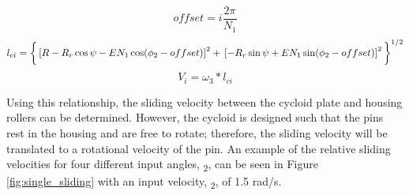 \begin{equation} \label{eq:single_slide_offset}
offset = i \frac{2\pi}{N_1}
\end{equation}
\begin{dmath} \label{eq:single_slide_length}
l_{ci} = \bigg\{\left[R-R_r\cos\psi - E N_1 \cos(\phi_2 - offset)\right]^2 
+\\ \left[-R_r \sin{\psi} + E N_1 \sin(\phi_2 - offset)\right]^2 \bigg\}^{1/2}
\end{dmath}
\begin{equation} \label{eq:single_slide_vel}
V_i = \omega_3 * l_{ci}
\end{equation}

Using this relationship, the sliding velocity between the cycloid plate and housing rollers can be determined. However, the cycloid is designed such that the pins rest in the housing and are free to rotate; therefore, the sliding velocity will be translated to a rotational velocity of the pin. An example of the relative sliding velocities for four different input angles, \textphi\textsubscript{2}, can be seen in Figure \ref{fig:single_sliding} with an input velocity, \textomega\textsubscript{2}, of 1.5 rad/s.


